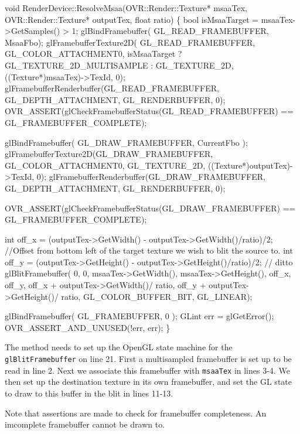 \documentclass[12pt,a4paper,twoside,openright]{report}
\begin{document}
\begin{blockcode}[commandchars=\\\{\}, numbers=left]
void RenderDevice::ResolveMsaa(OVR::Render::Texture* msaaTex, OVR::Render::Texture* outputTex, float ratio)
\{
    bool isMsaaTarget = msaaTex->GetSamples() > 1;
    glBindFramebuffer( GL_READ_FRAMEBUFFER, MsaaFbo);
    glFramebufferTexture2D( GL_READ_FRAMEBUFFER, GL_COLOR_ATTACHMENT0,
                            isMsaaTarget ? GL_TEXTURE_2D_MULTISAMPLE : GL_TEXTURE_2D,
                            ((Texture*)msaaTex)->TexId, 0);
    glFramebufferRenderbuffer(GL_READ_FRAMEBUFFER, GL_DEPTH_ATTACHMENT, GL_RENDERBUFFER, 0);
    OVR_ASSERT(glCheckFramebufferStatus(GL_READ_FRAMEBUFFER) == GL_FRAMEBUFFER_COMPLETE);

    glBindFramebuffer( GL_DRAW_FRAMEBUFFER, CurrentFbo );
    glFramebufferTexture2D(GL_DRAW_FRAMEBUFFER, GL_COLOR_ATTACHMENT0, GL_TEXTURE_2D, ((Texture*)outputTex)->TexId, 0);
    glFramebufferRenderbuffer(GL_DRAW_FRAMEBUFFER, GL_DEPTH_ATTACHMENT, GL_RENDERBUFFER, 0);

    OVR_ASSERT(glCheckFramebufferStatus(GL_DRAW_FRAMEBUFFER) == GL_FRAMEBUFFER_COMPLETE);

\color{green}    int off_x = (outputTex->GetWidth() - outputTex->GetWidth()/ratio)/2; //Offset from bottom left of the target texture we wish to blit the source to. 
\color{green}    int off_y = (outputTex->GetHeight() - outputTex->GetHeight()/ratio)/2; // ditto
\color{green}    glBlitFramebuffer( 0, 0, msaaTex->GetWidth(), msaaTex->GetHeight(), off_x, off_y,
\color{green}                             off_x + outputTex->GetWidth()/ ratio,
\color{green}                             off_y + outputTex->GetHeight()/ ratio,
\color{green}                             GL_COLOR_BUFFER_BIT, GL_LINEAR);

    glBindFramebuffer( GL_FRAMEBUFFER, 0 );  
    GLint err = glGetError();
    OVR_ASSERT_AND_UNUSED(!err, err);
\}
\end{blockcode}

The method needs to set up the OpenGL state machine for the \texttt{glBlitFramebuffer} on line 21. First a multisampled framebuffer is set up to be read in line 2. Next we associate this framebuffer with \texttt{msaaTex} in lines 3-4. 
We then set up the destination texture in its own framebuffer, and set the GL state to draw to this buffer in the blit in lines 11-13.

Note that assertions are made to check for framebuffer completeness. An imcomplete framebuffer cannot be drawn to.
\end{document}
